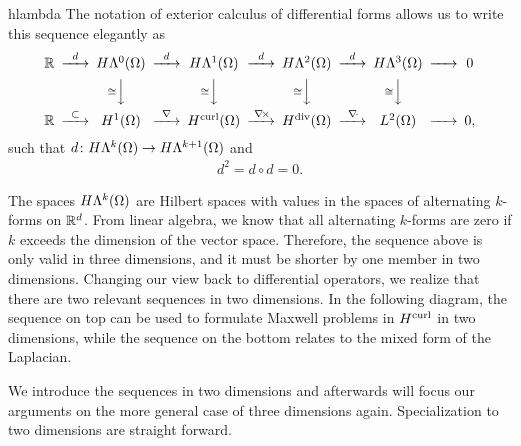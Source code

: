 \begin{Notation}{hlambda}
  The notation of exterior calculus of differential forms allows us to
  write this sequence elegantly as
  \begin{gather}\minCDarrowwidth20pt
    \begin{CD}
      \R
      @>{d}>> H\Lambda^0(\domain)
      @>{d}>> H\Lambda^1(\domain)
      @>{d}>> H\Lambda^2(\domain)
      @>{d}>> H\Lambda^3(\domain)
      @>>> 0
      \\
      @.
      @V{\cong}VV
      @V{\cong}VV
      @V{\cong}VV
      @V{\cong}VV
      \\
      \R
      @>{\subset}>> H^1(\domain)
      @>{\nabla}>> \Hcurl(\domain)
      @>{\curl}>> \Hdiv(\domain)
      @>{\div}>> L^2(\domain)
      @>>> 0,
    \end{CD}
  \end{gather}
  such that $d\colon H\Lambda^k(\Omega) \to H\Lambda^{k+1}(\Omega)$ and
  \begin{gather}
    d^2 = d\circ d = 0.
  \end{gather}
\end{Notation}

\begin{remark}
  The spaces $H\Lambda^k(\Omega)$ are Hilbert spaces with values in
  the spaces of alternating $k$-forms on $\mathbb R^d$. From linear algebra,
  we know that all alternating $k$-forms are zero if $k$ exceeds the
  dimension of the vector space.  Therefore, the sequence above is
  only valid in three dimensions, and it must be shorter by one member
  in two dimensions. Changing our view back to differential operators,
  we realize that there are two relevant sequences in two
  dimensions. In the following diagram, the sequence on top can be
  used to formulate Maxwell problems in $H^{\text{curl}}$ in two dimensions,
  while the sequence on the bottom relates to the mixed form of the
  Laplacian.

  We introduce the sequences in two dimensions and afterwards will
  focus our arguments on the more general case of three dimensions
  again. Specialization to two dimensions are straight forward.
\end{remark}

